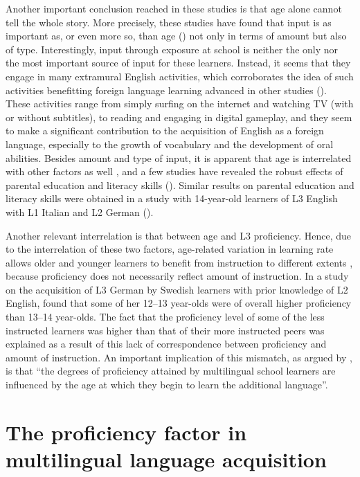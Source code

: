 \documentclass[output=paper]{../langscibook}
\begin{document}
Another important conclusion reached in these studies is that age alone cannot tell the whole story. More precisely, these studies have found that input is as important as, or even more so, than age (\citealt{Muñoz2006, Muñoz2014, Muñoz2019, PfenningerSingleton2017}) not only in terms of amount but also of type. Interestingly, input through exposure at school is neither the only nor the most important source of input for these learners. Instead, it seems that they engage in many extramural English activities, which corroborates the idea of such activities benefitting foreign language learning advanced in other studies (\citealt{SundqvistSylvén2014}). These activities range from simply surfing on the internet and watching TV (with or without subtitles), to reading and engaging in digital gameplay, and they seem to make a significant contribution to the acquisition of English as a foreign language, especially to the growth of vocabulary and the development of oral abilities. Besides amount and type of input, it is apparent that age is interrelated with other factors as well \citep{Muñoz2014}, and a few studies have revealed the robust effects of parental education and literacy skills (\citealt{PfenningerSingleton2017, Muñoz2019, MuñozSingleton2019}). Similar results on parental education and literacy skills were obtained in a study with 14-year-old learners of L3 English with L1 Italian and L2 German (\citealt{DeAngelis2015}).

Another relevant interrelation is that between age and L3 proficiency. Hence, due to the interrelation of these two factors, age-related variation in learning rate allows older and younger learners to benefit from instruction to different extents \citep{Muñoz2006}, because proficiency does not necessarily reflect amount of instruction. In a study on the acquisition of L3 German by Swedish learners with prior knowledge of L2 English, \citet{Sayehli2001} found that some of her 12--13 year-olds were of overall higher proficiency than 13--14 year-olds. The fact that the proficiency level of some of the less instructed learners was higher than that of their more instructed peers was explained as a result of this lack of correspondence between proficiency and amount of instruction. An important implication of this mismatch, as argued by \citet[214]{MuñozSingleton2019}, is that “the degrees of proficiency attained by multilingual school learners are influenced by the age at which they begin to learn the additional language”.

\section{The proficiency factor in multilingual language acquisition}\label{sec:sanchez1:3}
\end{document}
